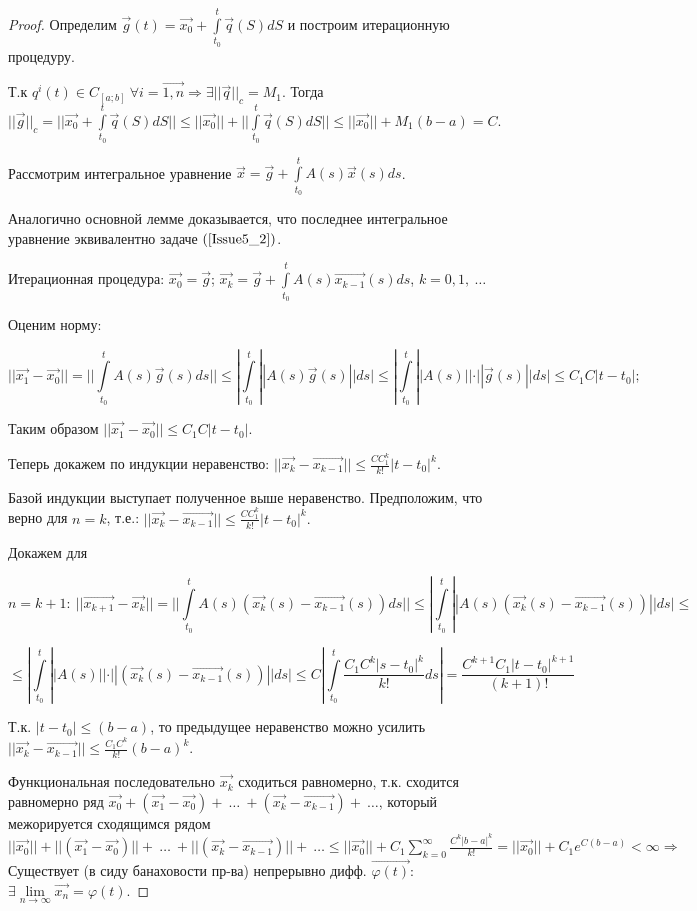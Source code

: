 \begin{proof}

Определим $\vec{g}(t) = \vec{x_0} + \int\limits_{t_0}^{t} \vec{q}(S)dS$ и построим итерационную процедуру.

Т.к $q^i(t) \in C_{[a;b]}\ \forall i = \vec{1,n} \Rightarrow \exists ||\vec{q}||_c = M_1.$ Тогда $||\vec{g}||_c = ||\vec{x_0} + \int\limits_{t_0}^{t}\vec{q}(S)dS|| \leqslant ||\vec{x_0}|| + ||\int\limits_{t_0}^{t}\vec{q}(S)dS|| \leqslant ||\vec{x_0}|| + M_1(b-a) = C.$

Рассмотрим интегральное уравнение $\vec{x} = \vec{g} + \int\limits_{t_0}^{t}A(s)\vec{x}(s)ds$.

Аналогично основной лемме доказывается, что последнее интегральное уравнение эквивалентно задаче $(\ref{Issue5_2})$.

Итерационная процедура: $\vec{x_0} = \vec{g}$; $\vec{x_k} = \vec{g} + \int\limits_{t_0}^{t} A(s)\vec{x_{k-1}}(s)ds $, $k = 0,1,\ \dots$

Оценим норму:

$$ ||\vec{x_1} - \vec{x_0}|| = || \int\limits_{t_0}^{t} A(s)\vec{g}(s)ds || \leqslant | \int\limits_{t_0}^{t} ||A(s)\vec{g}(s)||ds | \leqslant  | \int\limits_{t_0}^{t} ||A(s)||\cdot ||\vec{g}(s)||ds | \leqslant C_1 C |t - t_0|;$$ 

Таким образом $||\vec{x_1} -\vec{x_0}|| \leqslant C_1C|t-t_0|.$

Теперь докажем по индукции неравенство: $||\vec{x_k} - \vec{x_{k-1}}|| \leqslant \frac{CC_1^k}{k!}|t-t_0|^k.$

Базой индукции выступает полученное выше неравенство. Предположим, что верно для $n = k$, т.е.: $||\vec{x_k} - \vec{x_{k-1}}|| \leqslant \frac{CC_1^k}{k!}|t-t_0|^k.$

Докажем для 

\[n = k + 1:\  ||\vec{x_{k+1}} - \vec{x_{k}}|| = || \int\limits_{t_0}^{t} A(s)(\vec{x_k}(s) - \vec{x_{k-1}}(s))ds || \leqslant | \int\limits_{t_0}^{t} ||A(s)(\vec{x_k}(s) - \vec{x_{k-1}}(s))|| ds | \leqslant \]

\[ \leqslant | \int\limits_{t_0}^{t} ||A(s)||\cdot ||(\vec{x_k}(s) - \vec{x_{k-1}}(s))|| ds | \leqslant C |\int\limits_{t_0}^{t} \frac{C_1C^k|s-t_0|^k}{k!}ds | = \frac{C^{k+1}C_1|t-t_0|^{k+1}}{(k+1)!} \]

Т.к. $|t-t_0| \leqslant (b-a)$, то предыдущее неравенство можно усилить $||\vec{x_k} - \vec{x_{k-1}}|| \leqslant \frac{C_1C^k}{k!}(b-a)^k.$

Функциональная последовательно $\vec{x_k}$ сходиться равномерно, т.к. сходится равномерно ряд $\vec{x_0} + (\vec{x_1} - \vec{x_0}) +\ \dots\ +(\vec{x_k} - \vec{x_{k-1}}) +\ \dots$, который межорируется сходящимся рядом $||\vec{x_0}|| + ||(\vec{x_1} - \vec{x_0})|| +\ \dots\ + ||(\vec{x_k} - \vec{x_{k-1}})|| +\ \dots \leqslant ||\vec{x_0}|| + C_1\sum\limits_{k = 0}^{\infty}\frac{C^k|b-a|^k}{k!} = ||\vec{x_0}|| + C_1 e^{C(b-a)} < \infty \Rightarrow$ Существует (в сиду банаховости пр-ва) непрерывно дифф. $\vec{\varphi(t)}:$ $\exists \lim\limits_{n \rightarrow \infty} \vec{x_n} = \varphi(t).$


\end{proof}
